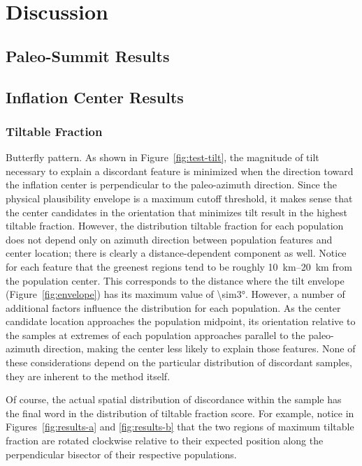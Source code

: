 \chapter{Discussion}\label{cha:discussion}

\section{Paleo-Summit Results}

\section{Inflation Center Results}

\subsection{Tiltable Fraction}\label{sec:tiltable-fraction}

Butterfly pattern. As shown in Figure~\ref{fig:test-tilt}, the magnitude of tilt necessary to explain a discordant feature is minimized when the direction toward the inflation center is perpendicular to the paleo-azimuth direction. Since the physical plausibility envelope is a maximum cutoff threshold, it makes sense that the center candidates in the orientation that minimizes tilt result in the highest tiltable fraction. However, the distribution tiltable fraction for each population does not depend only on azimuth direction between population features and center location; there is clearly a distance-dependent component as well. Notice for each feature that the greenest regions tend to be roughly \qtyrange{10}{20}{\km} from the population center. This corresponds to the distance where the tilt envelope (Figure~\ref{fig:envelope}) has its maximum value of \ang{\sim3}. However, a number of additional factors influence the distribution for each population. As the center candidate location approaches the population midpoint, its orientation relative to the samples at extremes of each population approaches parallel to the paleo-azimuth direction, making the center less likely to explain those features. None of these considerations depend on the particular distribution of discordant samples, they are inherent to the method itself.

Of course, the actual spatial distribution of discordance within the sample has the final word in the distribution of tiltable fraction score. For example, notice in Figures~\ref{fig:results-a} and \ref{fig:results-b} that the two regions of maximum tiltable fraction are rotated clockwise relative to their expected position along the perpendicular bisector of their respective populations.

